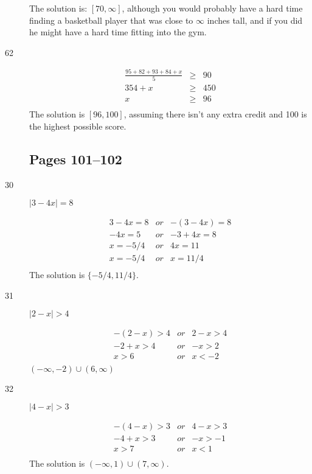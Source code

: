 \documentclass[letterpaper]{exam}
\begin{document}
\begin{description}
      The solution is: \( [70, \infty] \), although you would probably have a hard time finding a basketball player
      that was close to $\infty$ inches tall, and if you did he might have a hard time fitting into the gym.

      \item[62]

      \begin{align*}
        \frac{95 + 82 + 93 + 84 + x}{5} &\geq& 90 \\
        354 + x &\geq& 450 \\
        x &\geq& 96 \\
      \end{align*}
      The solution is \( [96, 100] \), assuming there isn't any extra credit and 100 is the highest possible score.

      \subsection{Pages 101--102} 

      \item[30]

      \( | 3 - 4x | = 8 \)

      \begin{align*}
        3 - 4x = 8 &or& -(3 - 4x) = 8 \\
         -4x = 5 &or& -3 + 4x = 8 \\
         x = -5/4 &or& 4x = 11 \\
         x = -5/4 &or& x = 11/4 \\
      \end{align*}
      The solution is \( \{-5/4, 11/4\} \).

      \item[31]

      \( | 2 - x | > 4 \)

      \begin{align*}
        -(2 - x) > 4 &or& 2 - x > 4 \\
        -2 + x > 4 &or&  -x > 2 \\
        x > 6 &or&  x < -2 \\
      \end{align*}
      $ \boxed{ (-\infty, -2) \cup (6, \infty) } $

      \item[32]

      \( | 4 - x | > 3 \)

      \begin{align*}
        -(4 - x) > 3 &or& 4 - x > 3 \\
        -4 + x > 3 &or&  -x > -1 \\
        x > 7 &or&  x < 1 \\
      \end{align*}
      The solution is \( (-\infty, 1) \cup (7, \infty) \).


\end{description}
\end{document}
